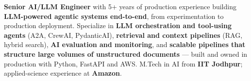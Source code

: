 \documentclass[letter,10pt]{article}
\begin{document}

\textbf{Senior AI/LLM Engineer} with 5+ years of production experience building \textbf{LLM-powered agentic systems end-to-end}, from experimentation to production deployment.
Specialize in \textbf{LLM orchestration and tool-using agents} (A2A, CrewAI, PydanticAI), \textbf{retrieval and context pipelines} (RAG, hybrid search), \textbf{AI evaluation and monitoring}, and \textbf{scalable pipelines that structure large volumes of unstructured documents} --- built and owned in production with Python, FastAPI and AWS.
M.Tech in AI from \textbf{IIT Jodhpur}; applied-science experience at \textbf{Amazon}.
\end{document}
